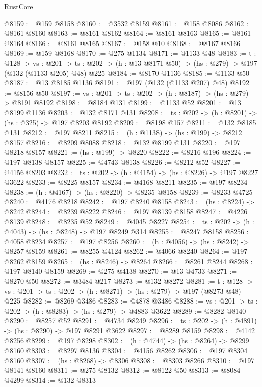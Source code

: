 \begin{lexlean}{RustCore}
\begin{coremodule}
@8159 := @159 @8158
@8160 := @3532 @8159
@8161 := @158 @8086
@8162 := @8161 @8160
@8163 := @8161 @8162
@8164 := @8161 @8163
@8165 := @8161 @8164
@8166 := @8161 @8165
@8167 := @158 @10
@8168 := @8167 @8166
@8169 := @159 @8168
@8170 := @275 @1134
@8171 := @1133 @48
@8183 := {t : @128} ->
  {vs : @201} ->
  {ts : @202} -> (h : @13 @8171 @50) -> (hs : @279) -> @197 (@132 (@1133 @205) @48) @225
@8184 := @8170 @1136
@8185 := @1133 @50
@8187 := @13 @8185 @1136
@8191 := @197 (@132 (@1133 @207) @48)
@8192 := @8156 @50
@8197 := {vs : @201} -> {ts : @202} -> (h : @8187) -> (hs : @279) -> @8191 @8192
@8198 := @8184 @131
@8199 := @1133 @52
@8201 := @13 @8199 @1136
@8203 := @132 @8171 @131
@8208 := {ts : @202} -> (h : @8201) -> (hs : @325) -> @197 @8203 @8192
@8209 := @8198 @157
@8211 := @132 @8185 @131
@8212 := @197 @8211
@8215 := (h : @1138) -> (hs : @199) -> @8212 @8157
@8216 := @8209 @8088
@8218 := @132 @8199 @131
@8220 := @197 @8218 @8157
@8221 := (hs : @199) -> @8220
@8222 := @8216 @196
@8224 := @197 @8138 @8157
@8225 := @4743 @8138
@8226 := @8212 @52
@8227 := @4156 @8203
@8232 := {ts : @202} -> (h : @4154) -> (hs : @8226) -> @197 @8227 @3622
@8233 := @8225 @8157
@8234 := @4168 @8211
@8235 := @197 @8234
@8238 := (h : @4167) -> (hs : @8220) -> @8235 @8158
@8239 := @8233 @4725
@8240 := @4176 @8218
@8242 := @197 @8240 @8158
@8243 := (hs : @8224) -> @8242
@8244 := @8239 @8222
@8246 := @197 @8139 @8158
@8247 := @4226 @8139
@8248 := @8235 @52
@8249 := @4045 @8227
@8254 := {ts : @202} -> (h : @4043) -> (hs : @8248) -> @197 @8249 @314
@8255 := @8247 @8158
@8256 := @4058 @8234
@8257 := @197 @8256
@8260 := (h : @4056) -> (hs : @8242) -> @8257 @8159
@8261 := @8255 @4124
@8262 := @4066 @8240
@8264 := @197 @8262 @8159
@8265 := (hs : @8246) -> @8264
@8266 := @8261 @8244
@8268 := @197 @8140 @8159
@8269 := @275 @4138
@8270 := @13 @4733
@8271 := @8270 @50
@8272 := @3484 @217
@8273 := @132 @8272
@8281 := {t : @128} ->
  {vs : @201} -> {ts : @202} -> (h : @8271) -> (hs : @279) -> @197 (@8273 @48) @225
@8282 := @8269 @3486
@8283 := @4878 @3486
@8288 := {vs : @201} -> {ts : @202} -> (h : @8283) -> (hs : @279) -> @4883 @3622
@8289 := @8282 @8140
@8290 := @8257 @52
@8291 := @4734 @8249
@8296 := {ts : @202} -> (h : @4891) -> (hs : @8290) -> @197 @8291 @3622
@8297 := @8289 @8159
@8298 := @4142 @8256
@8299 := @197 @8298
@8302 := (h : @4744) -> (hs : @8264) -> @8299 @8160
@8303 := @8297 @8136
@8304 := @4156 @8262
@8306 := @197 @8304 @8160
@8307 := (hs : @8268) -> @8306
@8308 := @8303 @8266
@8310 := @197 @8141 @8160
@8311 := @275 @8132
@8312 := @8122 @50
@8313 := @8084 @4299
@8314 := @132 @8313

\end{coremodule}
\end{lexlean}
